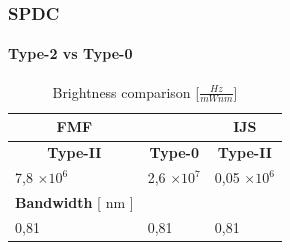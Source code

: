 \documentclass[serif,8pt]{beamer}
\begin{document}
{{\begin{frame}
	\frametitle{SPDC}
	\framesubtitle{Type-2 vs Type-0}
	\begin{table}
		\begin{center}
			\caption{Brightness comparison [$\frac{Hz}{mWnm}$]}
			\begin{tabular}[c|c|c]{|ll|l|}
				\hline
				\multicolumn{1}{|c}{\hfill\textbf{FMF}\hfill} &&
				\multicolumn{1}{c|}{\textbf{IJS}} \\
				\hline
				\multicolumn{1}{|c|}{\textbf{Type-II}} &
				\multicolumn{1}{c|}{\textbf{Type-0}} &
				\multicolumn{1}{c|}{\textbf{Type-II}} \\
				\hline
				7,8 $\times10^6$ & 2,6 $\times 10^7 $ & 0,05 $\times 10^6$ \\
				\hline
				\multicolumn{1}{|c}{\textbf{Bandwidth} [ nm ]} &\multicolumn{1}{c}{ } & \multicolumn{1}{c|}{ }  \\
				\hline
				0,81 & 0,81 & 0,81\\
				\hline
			\end{tabular}
		\end{center}
	\end{table}
\end{frame}




}}
\end{document}
